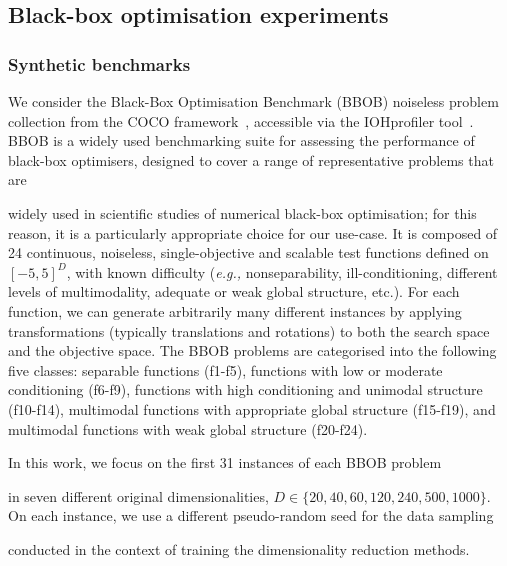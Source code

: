 \subsection{Black-box optimisation experiments}
\label{sec:ch04:bbo_setup}





\subsubsection*{Synthetic benchmarks}

We consider the Black-Box Optimisation Benchmark (BBOB) noiseless problem collection from the COCO framework~\citep{HanEtAl21}, accessible via the IOHprofiler tool~\citep{DoeEtAl18,WanEtAl22,DeNEtAl24}.
BBOB is a widely used benchmarking suite for assessing the performance of black-box optimisers, designed to cover a range of representative problems that are 


widely used in scientific studies of  numerical  black-box optimisation; 
for this reason, it is a particularly appropriate choice for our use-case.
It is composed of 24 continuous, noiseless, single-objective and scalable test functions defined on $[-5,5]^D$, with known difficulty (\emph{e.g.,} nonseparability, ill-conditioning, different levels of multimodality, adequate or weak global structure, etc.). 
For each function, we can generate arbitrarily many different instances by applying transformations (typically translations and rotations) to both the search space and the objective space. 
The BBOB problems are categorised into the following five classes: separable functions (f1-f5), functions with low or moderate conditioning (f6-f9),
functions with high conditioning and unimodal structure (f10-f14), multimodal functions with appropriate global structure (f15-f19), and multimodal functions with weak global structure (f20-f24).


In this work, we focus on the first 31 instances of each BBOB problem 


in seven different original dimensionalities, $D \in \{ 20,\allowbreak 40,\allowbreak 60,\allowbreak 120,\allowbreak 240,\allowbreak 500,\allowbreak 1000 \}$.
On each instance, we use a different pseudo-random seed for the data sampling 

conducted in the context of 
training the dimensionality reduction methods.











